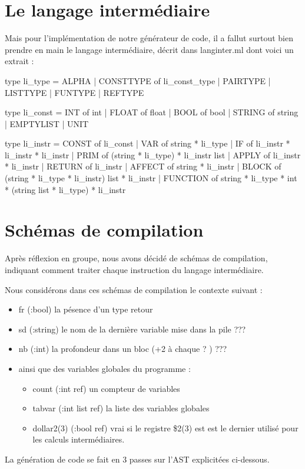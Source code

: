 \documentclass[a4paper, 11pt]{report}
\begin{document}
\section{Le langage intermédiaire}

Mais pour l'implémentation de notre générateur de code, il a fallut
surtout bien prendre en main le langage intermédiaire, décrit dans
langinter.ml dont voici un extrait :
\begin{OCaml}
type li_type = 
  ALPHA
| CONSTTYPE of li_const_type
| PAIRTYPE
| LISTTYPE
| FUNTYPE
| REFTYPE

type li_const = 
  INT of int
| FLOAT of float
| BOOL of bool
| STRING of string
| EMPTYLIST
| UNIT

type li_instr = 
  CONST of li_const
| VAR   of string * li_type
| IF  of li_instr * li_instr * li_instr
| PRIM of (string * li_type) * li_instr list
| APPLY of li_instr * li_instr
| RETURN of li_instr
| AFFECT of string * li_instr
| BLOCK of (string  * li_type * li_instr) list  * li_instr
| FUNCTION of string * li_type * int * (string list * li_type) * li_instr 
\end{OCaml}

\section{Schémas de compilation}
Après réflexion en groupe, nous avons décidé de schémas de
compilation, indiquant comment traiter chaque instruction du langage
intermédiaire.

Nous considérons dans ces schémas de compilation le contexte suivant :
\begin{itemize}
\item fr (:bool) la pésence d'un type retour
\item sd (:string) le nom de la dernière variable mise dans la pile ???
\item nb (:int) la profondeur dans un bloc (+2 à chaque ? ) ???
\item ainsi que des variables globales du programme :
  \begin{itemize}
   \item count (:int ref) un compteur de variables 
   \item tabvar (:int list ref) la liste des variables globales
   \item dollar2(3) (:bool ref) vrai si le registre \$2(3) est est le
     dernier utilisé pour les calculs intermédiaires.
\end{itemize}
\end{itemize}
La génération de code se fait en 3 passes sur l'AST explicitées ci-dessous.
\end{document}
